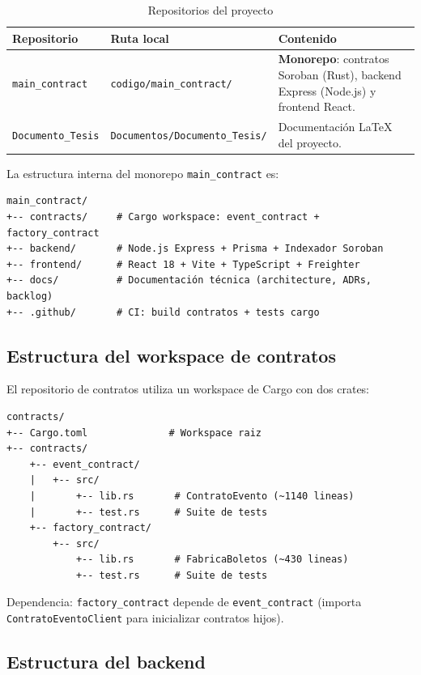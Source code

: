 \documentclass[12pt,oneside]{article}
\begin{document}
\begin{table}[htbp]
\centering
\caption{Repositorios del proyecto}
\begin{tabularx}{\textwidth}{l l X}
\toprule
\textbf{Repositorio} & \textbf{Ruta local} & \textbf{Contenido} \\
\midrule
\texttt{main\_contract} & \texttt{codigo/main\_contract/} & \textbf{Monorepo}: contratos Soroban (Rust), backend Express (Node.js) y frontend React. \\
\texttt{Documento\_Tesis} & \texttt{Documentos/Documento\_Tesis/} & Documentación LaTeX del proyecto. \\
\bottomrule
\end{tabularx}
\end{table}

La estructura interna del monorepo \texttt{main\_contract} es:

\begin{verbatim}
main_contract/
+-- contracts/     # Cargo workspace: event_contract + factory_contract
+-- backend/       # Node.js Express + Prisma + Indexador Soroban
+-- frontend/      # React 18 + Vite + TypeScript + Freighter
+-- docs/          # Documentación técnica (architecture, ADRs, backlog)
+-- .github/       # CI: build contratos + tests cargo
\end{verbatim}

\subsection{Estructura del workspace de contratos}

El repositorio de contratos utiliza un workspace de Cargo con dos crates:

\begin{verbatim}
contracts/
+-- Cargo.toml              # Workspace raiz
+-- contracts/
    +-- event_contract/
    |   +-- src/
    |       +-- lib.rs       # ContratoEvento (~1140 lineas)
    |       +-- test.rs      # Suite de tests
    +-- factory_contract/
        +-- src/
            +-- lib.rs       # FabricaBoletos (~430 lineas)
            +-- test.rs      # Suite de tests
\end{verbatim}

Dependencia: \texttt{factory\_contract} depende de \texttt{event\_contract} (importa \texttt{ContratoEventoClient} para inicializar contratos hijos).

\subsection{Estructura del backend}
\end{document}
